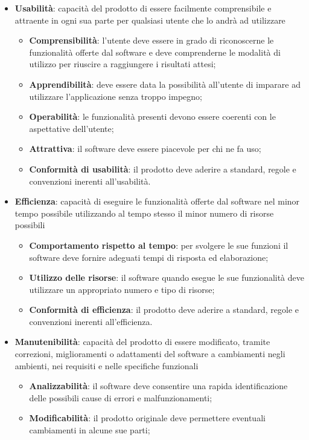 \begin{itemize}
\item\textbf{Usabilità}: capacità del prodotto di essere facilmente comprensibile e attraente in ogni sua parte per qualsiasi utente che lo andrà ad utilizzare
\begin{itemize}
\item\textbf{Comprensibilità}: l'utente deve essere in grado di riconoscerne le funzionalità offerte dal software e deve comprenderne le modalità di utilizzo per riuscire a raggiungere i risultati attesi;
\item\textbf{Apprendibilità}: deve essere data la possibilità all'utente di imparare ad utilizzare l'applicazione senza troppo impegno;
\item\textbf{Operabilità}: le funzionalità presenti devono essere coerenti con le aspettative dell'utente;
\item\textbf{Attrattiva}: il software deve essere piacevole per chi ne fa uso;
\item\textbf{Conformità di usabilità}: il prodotto deve aderire a standard, regole e convenzioni inerenti all'usabilità.
\end{itemize}
\item\textbf{Efficienza}: capacità di eseguire le funzionalità offerte dal software nel minor tempo possibile utilizzando al tempo stesso il minor numero di risorse possibili
\begin{itemize}
\item\textbf{Comportamento rispetto al tempo}: per svolgere le sue funzioni il software deve fornire adeguati tempi di risposta ed elaborazione;
\item\textbf{Utilizzo delle risorse}: il software quando esegue le sue funzionalità deve utilizzare un appropriato numero e tipo di risorse;
\item\textbf{Conformità di efficienza}: il prodotto deve aderire a standard, regole e convenzioni inerenti all'efficienza.
\end{itemize}
\item\textbf{Manutenibilità}: capacità del prodotto di essere modificato, tramite correzioni, miglioramenti o adattamenti del software a cambiamenti negli ambienti, nei requisiti e nelle specifiche funzionali
\begin{itemize}
\item\textbf{Analizzabilità}: il software deve consentire una rapida identificazione delle possibili cause di errori e malfunzionamenti;
\item\textbf{Modificabilità}: il prodotto originale deve permettere eventuali cambiamenti in alcune sue parti;

\end{itemize}
\end{itemize}

